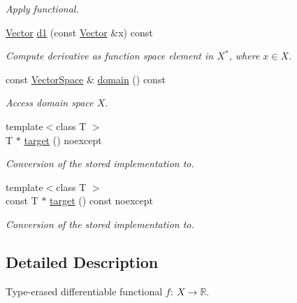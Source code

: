 \begin{DoxyCompactItemize}
\begin{DoxyCompactList}\small\item\em Apply functional. \end{DoxyCompactList}\item 
\hyperlink{classSpacy_1_1Vector}{Vector} \hyperlink{classSpacy_1_1C1Functional_a5953291c58bf20e87ab2bfe26231fe49}{d1} (const \hyperlink{classSpacy_1_1Vector}{Vector} \&x) const \hypertarget{classSpacy_1_1C1Functional_a5953291c58bf20e87ab2bfe26231fe49}{}\label{classSpacy_1_1C1Functional_a5953291c58bf20e87ab2bfe26231fe49}

\begin{DoxyCompactList}\small\item\em Compute derivative as function space element in $X^*$, where $x\in X$. \end{DoxyCompactList}\item 
const \hyperlink{classSpacy_1_1VectorSpace}{Vector\+Space} \& \hyperlink{classSpacy_1_1C1Functional_a3ec8df7e7998b557445c907cbd8e80b8}{domain} () const \hypertarget{classSpacy_1_1C1Functional_a3ec8df7e7998b557445c907cbd8e80b8}{}\label{classSpacy_1_1C1Functional_a3ec8df7e7998b557445c907cbd8e80b8}

\begin{DoxyCompactList}\small\item\em Access domain space $X$. \end{DoxyCompactList}\item 
{\footnotesize template$<$class T $>$ }\\T $\ast$ \hyperlink{classSpacy_1_1C1Functional_adf7c0fc5a81009ebf4f8c5d9bdb9ec98}{target} () noexcept
\begin{DoxyCompactList}\small\item\em Conversion of the stored implementation to. \end{DoxyCompactList}\item 
{\footnotesize template$<$class T $>$ }\\const T $\ast$ \hyperlink{classSpacy_1_1C1Functional_aa016d1671e43b875064cf3d9d9bb6351}{target} () const noexcept
\begin{DoxyCompactList}\small\item\em Conversion of the stored implementation to. \end{DoxyCompactList}\end{DoxyCompactItemize}


\subsection{Detailed Description}
Type-\/erased differentiable functional $f:\ X \to \mathbb{R} $. 

